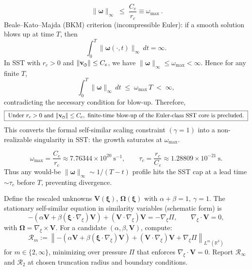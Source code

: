 \documentclass[10pt,reprint,aps,onecolumn,nofootinbib]{revtex4-2}
\newcommand{\vswirl}{\mathbf{v}_{\!\boldsymbol{\circlearrowleft}}}
\newcommand{\vnorm}{\lVert \mathbf{v}_{\mkern-2mu\scriptscriptstyle\boldsymbol{\circlearrowleft}} \rVert}               %
\begin{document}
    \[
        \boxed{\ \lVert \boldsymbol{\omega} \rVert_\infty \;\le\; \frac{C_e}{r_c} \equiv \omega_{\max}\ } .
    \]
    Beale–Kato–Majda (BKM) criterion (incompressible Euler): if a smooth solution blows up at time \(T\), then
    \[
        \int_0^T \lVert \boldsymbol{\omega}(\cdot,t) \rVert_\infty \, dt = \infty .
    \]
    In SST with \(r_c>0\) and \(\vnorm\le C_e\), we have \(\lVert \boldsymbol{\omega}\rVert_\infty\le \omega_{\max}<\infty\).
    Hence for any finite \(T\),
    \[
        \int_0^T \lVert \boldsymbol{\omega} \rVert_\infty \, dt \;\le\; \omega_{\max}\,T \;<\;\infty,
    \]
    contradicting the necessary condition for blow-up. Therefore,
    \[
        \boxed{\ \text{Under } r_c>0 \text{ and } \vnorm\le C_e,\ \text{finite-time blow-up of the Euler-class SST core is precluded.}\ }
    \]
    This converts the formal self-similar scaling constraint \((\gamma=1)\) into a non-realizable singularity in SST: the growth saturates at \(\omega_{\max}\).

    \[
        \omega_{\max}=\frac{C_e}{r_c}\approx 7.76344\times 10^{20}\ \mathrm{s^{-1}},\qquad
        \tau_c=\frac{r_c}{C_e}\approx 1.28809\times 10^{-21}\ \mathrm{s}.
    \]
    Thus any would-be \( \lVert\boldsymbol{\omega}\rVert_\infty\sim 1/(T-t) \) profile hits the SST cap at a lead time \(\sim \tau_c\) before \(T\), preventing divergence.

    Define the rescaled unknowns \(\mathbf{V}(\boldsymbol{\xi})\), \(\boldsymbol{\Omega}(\boldsymbol{\xi})\) with \(\alpha+\beta=1,\ \gamma=1\).
    The stationary self-similar equation in similarity variables (schematic form) is
    \[
        -\left(\alpha \mathbf{V} + \beta (\boldsymbol{\xi}\!\cdot\!\nabla_{\!\xi})\mathbf{V}\right)
        + (\mathbf{V}\!\cdot\!\nabla_{\!\xi})\mathbf{V} = -\nabla_{\!\xi} \Pi,\qquad
        \nabla_{\!\xi}\!\cdot\!\mathbf{V}=0,
    \]
    with \(\boldsymbol{\Omega}=\nabla_{\!\xi}\times\mathbf{V}\).
    For a candidate \((\alpha,\beta,\mathbf{V})\), compute:
    \[
        \mathcal{R}_m := \left\lVert
                             -\left(\alpha \mathbf{V} + \beta (\boldsymbol{\xi}\!\cdot\!\nabla_{\!\xi})\mathbf{V}\right)
                             + (\mathbf{V}\!\cdot\!\nabla_{\!\xi})\mathbf{V} + \nabla_{\!\xi}\Pi
        \right\rVert_{L^m(\mathbb{R}^3)}
    \]
    for \(m\in\{2,\infty\}\), minimizing over pressure \(\Pi\) that enforces \(\nabla_{\!\xi}\!\cdot\!\mathbf{V}=0\).
    Report \(\mathcal{R}_\infty\) and \(\mathcal{R}_2\) at chosen truncation radius and boundary conditions.
\end{document}
